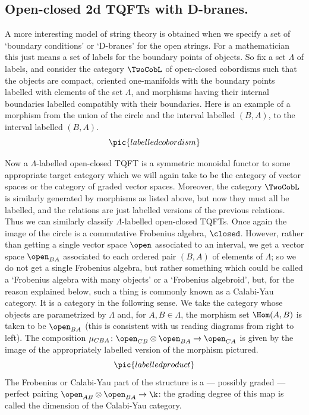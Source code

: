  \subsection{Open-closed 2d TQFTs with D-branes.}
A more interesting model of string theory is obtained when we specify
a set of `boundary conditions' or `D-branes' for the open strings. For
a mathematician this just means a set of labels for the boundary
points of objects.  So fix a set $\Lambda$ of labels, and consider the
category $\TwoCobL$ of open-closed cobordisms such that the objects
are compact, oriented one-manifolds with the boundary points labelled
with elements of the set $\Lambda$, and morphisms having their
internal boundaries labelled compatibly with their boundaries. Here is
an example of a morphism from the union of the circle and the interval
labelled $(B,A)$, to the interval labelled $(B,A)$.
\[\pic{labelledcobordism}\]


Now a $\Lambda$-labelled open-closed TQFT is a symmetric monoidal
functor to some appropriate target category which we will again take
to be the category of vector spaces or the category of graded vector
spaces. Moreover, the category $\TwoCobL$ is similarly generated by
morphisms as listed above, but now they must all be labelled, and the
relations are just labelled versions of the previous relations.  Thus
we can similarly classify $\Lambda$-labelled open-closed TQFTs.  Once
again the image of the circle is a commutative Frobenius algebra,
$\closed$.  However, rather than getting a single vector space $\open$
associated to an interval, we get a vector space $\open_{BA}$
associated to each ordered pair $(B,A)$ of elements of $\Lambda$; so
we do not get a single Frobenius algebra, but rather something which
could be called a `Frobenius algebra with many objects' or a
`Frobenius algebroid', but, for the reason explained below, such a
thing is commonly known as a Calabi-Yau category.  It is a category in
the following sense.  We take the category whose objects are
parametrized by $\Lambda$ and, for $A,B\in \Lambda$, the morphism set
$\Hom(A,B)$ is taken to be $\open_{BA}$ (this is consistent with us
reading diagrams from right to left).  The composition
$\mu_{CBA}\colon\open_{CB}\otimes\open_{BA}\to\open_{CA}$ is given by
the image of the appropriately labelled version of the morphism
pictured.
\[\pic{labelledproduct}\]
The Frobenius or Calabi-Yau part of the structure is a --- possibly
graded --- perfect pairing $\open_{AB}\otimes\open_{BA}\to \k$: the
grading degree of this map is called the dimension of the Calabi-Yau
category.


